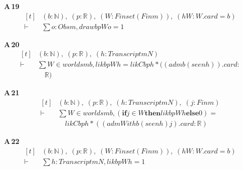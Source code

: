 \noindent\textbf{A\,19}\quad{}
{\footnotesize\[ \begin{aligned}[t]
&(\mathit{b} : \mathbb{N} ),\; (\mathit{p} : \mathbb{R} ),\; (\mathit{W} : \mathit{Finset} (\mathit{Fin} \mathit{m})),\; (\mathit{hW} : \mathit{W}.\mathit{card} = \mathit{b})\\
\vdash\;&\textstyle\sum \mathit{o} : \mathit{Obs} \mathit{m}, \mathit{draw} \mathit{b} \mathit{p} \mathit{W} \mathit{o} = 1
\end{aligned} \]}

\noindent\textbf{A\,20}\quad{}
{\footnotesize\[ \begin{aligned}[t]
&(\mathit{b} : \mathbb{N} ),\; (\mathit{p} : \mathbb{R} ),\; (\mathit{h} : \mathit{Transcript} \mathit{m} \mathit{N})\\
\vdash\;&\textstyle\sum \mathit{W} \in \mathit{worlds} \mathit{m} \mathit{b}, \mathit{lik} \mathit{b} \mathit{p} \mathit{W} \mathit{h} = \mathit{likC} \mathit{b} \mathit{p} \mathit{h} * ((\mathit{adm} \mathit{b} (\mathit{seen} \mathit{h})).\mathit{card} :\\
&\quad \mathbb{R} )
\end{aligned} \]}

\noindent\textbf{A\,21}\quad{}
{\footnotesize\[ \begin{aligned}[t]
&(\mathit{b} : \mathbb{N} ),\; (\mathit{p} : \mathbb{R} ),\; (\mathit{h} : \mathit{Transcript} \mathit{m} \mathit{N}),\; (\mathit{j} : \mathit{Fin} \mathit{m})\\
\vdash\;&\textstyle\sum \mathit{W} \in \mathit{worlds} \mathit{m} \mathit{b}, (\mathbf{if} \mathit{j} \in \mathit{W} \mathbf{then} \mathit{lik} \mathit{b} \mathit{p} \mathit{W} \mathit{h} \mathbf{else} 0) =\\
&\quad \mathit{likC} \mathit{b} \mathit{p} \mathit{h} * ((\mathit{admWith} \mathit{b} (\mathit{seen} \mathit{h}) \mathit{j}).\mathit{card} : \mathbb{R} )
\end{aligned} \]}

\noindent\textbf{A\,22}\quad{}
{\footnotesize\[ \begin{aligned}[t]
&(\mathit{b} : \mathbb{N} ),\; (\mathit{p} : \mathbb{R} ),\; (\mathit{W} : \mathit{Finset} (\mathit{Fin} \mathit{m})),\; (\mathit{hW} : \mathit{W}.\mathit{card} = \mathit{b})\\
\vdash\;&\textstyle\sum \mathit{h} : \mathit{Transcript} \mathit{m} \mathit{N}, \mathit{lik} \mathit{b} \mathit{p} \mathit{W} \mathit{h} = 1
\end{aligned} \]}

